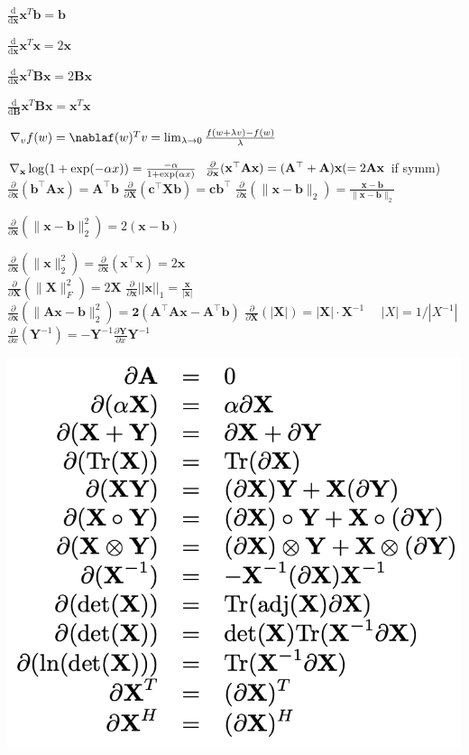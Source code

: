 $\frac{\text{d}}{\text{d}\mathbf x}\mathbf x^T\mathbf b=\mathbf b$

$\frac{\text{d}}{\text{d}\mathbf x}\mathbf x^T\mathbf x=2\mathbf x$

$\frac{\text{d}}{\text{d}\mathbf x}\mathbf x^T\mathbf B \mathbf x=2\mathbf B\mathbf x$

$\frac{\text{d}}{\text{d}\mathbf B}\mathbf x^T\mathbf B \mathbf x=\mathbf x^T\mathbf x$


$\nabla_v f(w)=\nablaf(w)^T v=\lim_{\lambda \rightarrow 0}\frac{f(w+\lambda v)-f(w)}{\lambda}$

$\nabla_{\mathbf{x}}\log(1+\exp(-\alpha x))=\frac{-\alpha}{1+\exp(\alpha x)}$
$\frac{\partial}{\partial \mathbf{x}}(\mathbf{x}^\top \mathbf{A}\mathbf{x}) = (\mathbf{A}^\top + \mathbf{A})\mathbf{x} (= 2\mathbf{A}\mathbf{x}$ if symm) \quad\\
$\frac{\partial}{\partial \mathbf{x}}(\mathbf{b}^\top \mathbf{A}\mathbf{x}) = \mathbf{A}^\top \mathbf{b}$ \quad
$\frac{\partial}{\partial \mathbf{X}}(\mathbf{c}^\top \mathbf{X} \mathbf{b}) = \mathbf{c}\mathbf{b}^\top$ \quad
$\frac{\partial}{\partial \mathbf{x}}(\| \mathbf{x}-\mathbf{b} \|_2) = \frac{\mathbf{x}-\mathbf{b}}{\|\mathbf{x}-\mathbf{b}\|_2}$

$\frac{\partial}{\partial \mathbf{x}}(\| \mathbf{x}-\mathbf{b} \|_2^2) = 2(\mathbf x -\mathbf b)$

$\frac{\partial}{\partial \mathbf{x}}(\|\mathbf{x}\|^2_2) = \frac{\partial}{\partial \mathbf{x}} (\mathbf{x}^\top \mathbf{x}) = 2\mathbf{x}$ \quad
\\$\frac{\partial}{\partial \mathbf{X}}(\|\mathbf{X}\|_F^2) = 2\mathbf{X}$  \quad \quad
$\frac{\partial}{\partial \mathbf{x}}||\mathbf{x}||_1 = \frac{\mathbf{x}}{|\mathbf{x}|}$ \\
$\frac{\partial}{\partial \mathbf{x}}(\|\mathbf{Ax - b}\|_2^2) = \mathbf{2(A^\top Ax-A^\top b)}$ \quad
$\frac{\partial}{\partial \mathbf{X}}(|\mathbf{X}|) = |\mathbf{X}|\cdot \mathbf{X}^{-1}$ $\quad |X| = 1 / |X^{-1}|$\\
$\frac{\partial}{\partial x}(\mathbf{Y}^{-1}) = -\mathbf{Y}^{-1} \frac{\partial\mathbf{Y}}{\partial x} \mathbf{Y}^{-1}$

\includegraphics[width=.7\columnwidth]{src/matrix_deriv.png}

